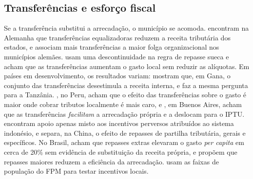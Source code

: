 \documentclass[10pt,twocolumn]{article}
\begin{document}
\subsection{Transferências e esforço fiscal}
Se a transferência substitui a arrecadação, o município se acomoda. \citet{baretti2002} encontram na Alemanha que transferências equalizadoras reduzem a receita tributária dos estados, e \citet{kalb2010} associam mais transferências a maior folga organizacional nos municípios alemães. \citet{dahlberg2008} usam uma descontinuidade na regra de repasse sueca e acham que as transferências aumentam o gasto local sem reduzir as alíquotas. Em países em desenvolvimento, os resultados variam: \citet{mogues2012} mostram que, em Gana, o conjunto das transferências desestimula a receita interna, e \citet{masaki2018} faz a mesma pergunta para a Tanzânia. \citet{aragon2013}, no Peru, acham que o efeito das transferências sobre o gasto é maior onde cobrar tributos localmente é mais caro, e \citet{porto2023}, em Buenos Aires, acham que as transferências \textit{facilitam} a arrecadação própria e a deslocam para o IPTU. \citet{lewis2017} encontram apoio apenas misto aos incentivos perversos atribuídos ao sistema indonésio, e \citet{zhang2013} separa, na China, o efeito de repasses de partilha tributária, gerais e específicos. No Brasil, \citet{litschig2013} acham que repasses extras elevaram o gasto \textit{per capita} em cerca de 20\% sem evidência de substituição da receita própria, e \citet{mattos2011} propõem que repasses maiores reduzem a eficiência da arrecadação. \citet{alves2024} usam as faixas de população do FPM para testar incentivos locais.
\end{document}
